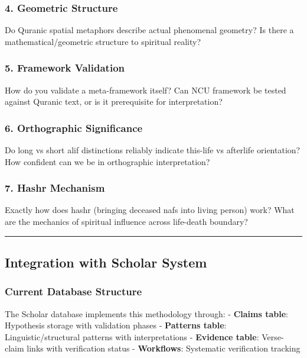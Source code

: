 \documentclass[12pt,a4paper]{article}
\begin{document}
\subsubsection{4. Geometric Structure}\label{geometric-structure}

Do Quranic spatial metaphors describe actual phenomenal geometry? Is
there a mathematical/geometric structure to spiritual reality?

\subsubsection{5. Framework Validation}\label{framework-validation}

How do you validate a meta-framework itself? Can NCU framework be tested
against Quranic text, or is it prerequisite for interpretation?

\subsubsection{6. Orthographic
Significance}\label{orthographic-significance}

Do long vs short alif distinctions reliably indicate this-life vs
afterlife orientation? How confident can we be in orthographic
interpretation?

\subsubsection{7. Hashr Mechanism}\label{hashr-mechanism}

Exactly how does hashr (bringing deceased nafs into living person) work?
What are the mechanics of spiritual influence across life-death
boundary?

\begin{center}\rule{0.5\linewidth}{0.5pt}\end{center}

\subsection{Integration with Scholar
System}\label{integration-with-scholar-system}

\subsubsection{Current Database
Structure}\label{current-database-structure}

The Scholar database implements this methodology through: -
\textbf{Claims table}: Hypothesis storage with validation phases -
\textbf{Patterns table}: Linguistic/structural patterns with
interpretations - \textbf{Evidence table}: Verse-claim links with
verification status - \textbf{Workflows}: Systematic verification
tracking
\end{document}
